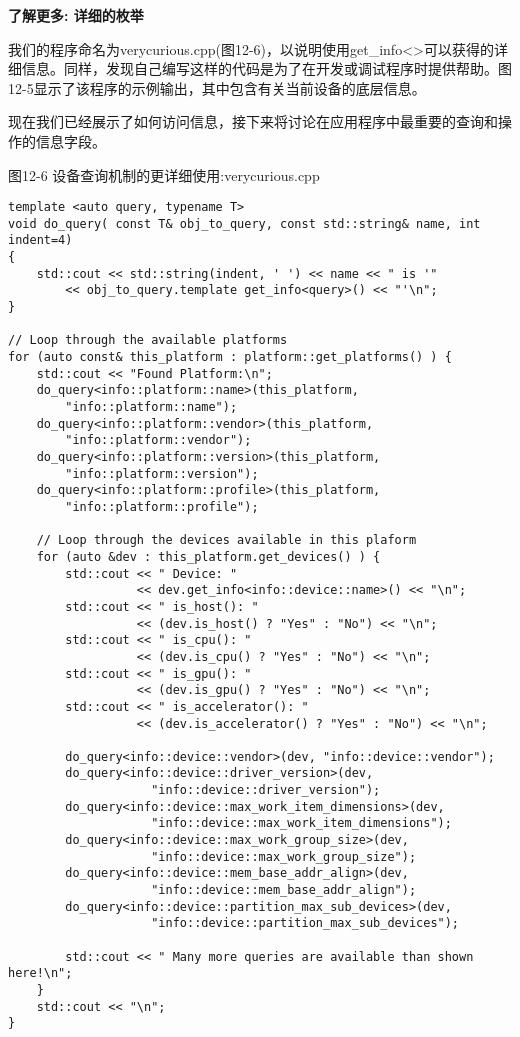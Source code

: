 \hspace*{\fill} \par %
\textbf{了解更多: 详细的枚举}

我们的程序命名为verycurious.cpp(图12-6)，以说明使用get\_info<>可以获得的详细信息。同样，发现自己编写这样的代码是为了在开发或调试程序时提供帮助。图12-5显示了该程序的示例输出，其中包含有关当前设备的底层信息。\par

现在我们已经展示了如何访问信息，接下来将讨论在应用程序中最重要的查询和操作的信息字段。\par

\hspace*{\fill} \par %
图12-6 设备查询机制的更详细使用:verycurious.cpp
\begin{lstlisting}[caption={}]
template <auto query, typename T>
void do_query( const T& obj_to_query, const std::string& name, int indent=4) 
{
	std::cout << std::string(indent, ' ') << name << " is '"
		<< obj_to_query.template get_info<query>() << "'\n";
}

// Loop through the available platforms
for (auto const& this_platform : platform::get_platforms() ) {
	std::cout << "Found Platform:\n";
	do_query<info::platform::name>(this_platform,
		"info::platform::name");
	do_query<info::platform::vendor>(this_platform, 
		"info::platform::vendor");
	do_query<info::platform::version>(this_platform, 
		"info::platform::version");
	do_query<info::platform::profile>(this_platform, 
		"info::platform::profile");
		
	// Loop through the devices available in this plaform
	for (auto &dev : this_platform.get_devices() ) {
		std::cout << " Device: "
				  << dev.get_info<info::device::name>() << "\n";
		std::cout << " is_host(): "
				  << (dev.is_host() ? "Yes" : "No") << "\n";
		std::cout << " is_cpu(): "
				  << (dev.is_cpu() ? "Yes" : "No") << "\n";
		std::cout << " is_gpu(): "
			  	  << (dev.is_gpu() ? "Yes" : "No") << "\n";
		std::cout << " is_accelerator(): "
				  << (dev.is_accelerator() ? "Yes" : "No") << "\n";
				  
		do_query<info::device::vendor>(dev, "info::device::vendor");
		do_query<info::device::driver_version>(dev,
					"info::device::driver_version");
		do_query<info::device::max_work_item_dimensions>(dev,
					"info::device::max_work_item_dimensions");
		do_query<info::device::max_work_group_size>(dev,
					"info::device::max_work_group_size");
		do_query<info::device::mem_base_addr_align>(dev,
					"info::device::mem_base_addr_align");
		do_query<info::device::partition_max_sub_devices>(dev,
					"info::device::partition_max_sub_devices");
					
		std::cout << " Many more queries are available than shown here!\n";
	}
	std::cout << "\n";
}
\end{lstlisting}

